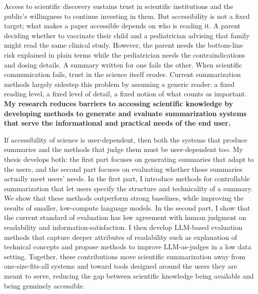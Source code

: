 

Access to scientific discovery sustains trust in scientific institutions and the public's willingness to continue investing in them. But accessibility is not a fixed target; what makes a paper accessible depends on who is reading it. A parent deciding whether to vaccinate their child and a pediatrician advising that family might read the same clinical study. However, the parent needs the bottom-line risk explained in plain terms while the pediatrician needs the contraindications and dosing details. A summary written for one fails the other.
When scientific communication fails, trust in the science itself erodes. Current summarization methods largely sidestep this problem by assuming a generic reader: a fixed reading level, a fixed level of detail, a fixed notion of what counts as important. \textbf{My research reduces barriers to accessing scientific knowledge by developing methods to generate and evaluate summarization systems that serve the informational and practical needs of the end user. }

If accessibility of science is user-dependent, then both the systems that produce summaries and the methods that judge them must be user-dependent too. My thesis develops both: the first part focuses on generating summaries that adapt to the users, and the second part focuses on evaluating whether those summaries actually meet users' needs. In the first part, I introduce methods for controllable summarization that let users specify the structure and technicality of a summary. We show that these methods outperform strong baselines, while improving the results of smaller, low-compute language models. In the second part, I show that the current standard of evaluation has low agreement with human judgment on readability and information-satisfaction. I then develop LLM-based evaluation methods that capture deeper attributes of readability such as explanation of technical concepts and propose methods to improve LLM-as-judges in a low data setting. Together, these contributions move scientific summarization away from one-size-fits-all systems and toward tools designed around the users they are meant to serve, reducing the gap between scientific knowledge being available and being genuinely accessible.






